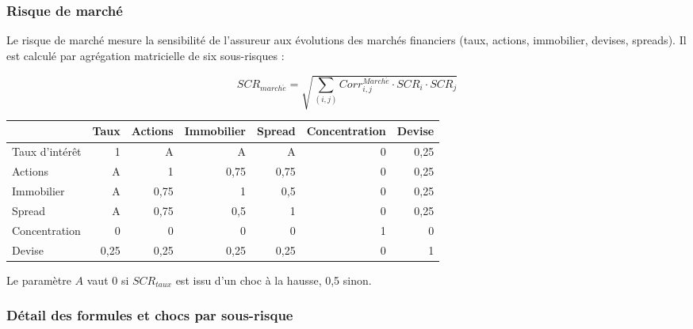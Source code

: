 \documentclass[
]{article}
\begin{document}
\subsubsection{Risque de marché}\label{risque-de-marchuxe9}

Le risque de marché mesure la sensibilité de l'assureur aux évolutions
des marchés financiers (taux, actions, immobilier, devises, spreads). Il
est calculé par agrégation matricielle de six sous-risques :

\[SCR_{march\acute{e}} = \sqrt{\sum_{(i,j)} Corr^{March\acute{e}}_{i,j} \cdot SCR_i \cdot SCR_j}\]

\begin{longtable}[]{@{}lrrrrrr@{}}
\toprule\noalign{}
& Taux & Actions & Immobilier & Spread & Concentration & Devise \\
\midrule\noalign{}
\endhead
\bottomrule\noalign{}
\endlastfoot
Taux d'intérêt & 1 & A & A & A & 0 & 0,25 \\
Actions & A & 1 & 0,75 & 0,75 & 0 & 0,25 \\
Immobilier & A & 0,75 & 1 & 0,5 & 0 & 0,25 \\
Spread & A & 0,75 & 0,5 & 1 & 0 & 0,25 \\
Concentration & 0 & 0 & 0 & 0 & 1 & 0 \\
Devise & 0,25 & 0,25 & 0,25 & 0,25 & 0 & 1 \\
\end{longtable}

Le paramètre \(A\) vaut 0 si \(SCR_{taux}\) est issu d'un choc à la
hausse, 0,5 sinon.

\subsubsection{Détail des formules et chocs par
sous-risque}\label{duxe9tail-des-formules-et-chocs-par-sous-risque}
\end{document}
